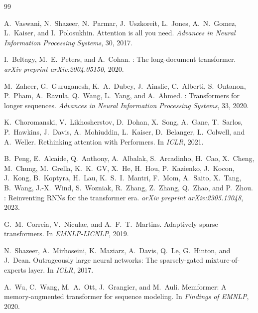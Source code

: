 \documentclass[10pt,twocolumn]{article}
\theoremstyle{plain}
\theoremstyle{definition}
\theoremstyle{remark}
\begin{document}
\begingroup
\small
\begin{thebibliography}{99}

A.~Vaswani, N.~Shazeer, N.~Parmar, J.~Uszkoreit, L.~Jones, A.~N.~Gomez,
L.~Kaiser, and I.~Polosukhin.
\newblock Attention is all you need.
\newblock \textit{Advances in Neural Information Processing Systems}, 30, 2017.

I.~Beltagy, M.~E.~Peters, and A.~Cohan.
: The long-document transformer.
\newblock \textit{arXiv preprint arXiv:2004.05150}, 2020.

M.~Zaheer, G.~Guruganesh, K.~A.~Dubey, J.~Ainslie, C.~Alberti, S.~Ontanon,
P.~Pham, A.~Ravula, Q.~Wang, L.~Yang, and A.~Ahmed.
: Transformers for longer sequences.
\newblock \textit{Advances in Neural Information Processing Systems}, 33, 2020.

K.~Choromanski, V.~Likhosherstov, D.~Dohan, X.~Song, A.~Gane, T.~Sarlos,
P.~Hawkins, J.~Davis, A.~Mohiuddin, L.~Kaiser, D.~Belanger, L.~Colwell,
and A.~Weller.
\newblock Rethinking attention with {Performers}.
\newblock In \textit{ICLR}, 2021.

B.~Peng, E.~Alcaide, Q.~Anthony, A.~Albalak, S.~Arcadinho, H.~Cao,
X.~Cheng, M.~Chung, M.~Grella, K.~K.~GV, X.~He, H.~Hou, P.~Kazienko,
J.~Kocon, J.~Kong, B.~Koptyra, H.~Lau, K.~S.~I.~Mantri, F.~Mom,
A.~Saito, X.~Tang, B.~Wang, J.-X.~Wind, S.~Wozniak, R.~Zhang, Z.~Zhang,
Q.~Zhao, and P.~Zhou.
: Reinventing {RNNs} for the transformer era.
\newblock \textit{arXiv preprint arXiv:2305.13048}, 2023.

G.~M.~Correia, V.~Niculae, and A.~F.~T.~Martins.
\newblock Adaptively sparse transformers.
\newblock In \textit{EMNLP-IJCNLP}, 2019.

N.~Shazeer, A.~Mirhoseini, K.~Maziarz, A.~Davis, Q.~Le, G.~Hinton, and
J.~Dean.
\newblock Outrageously large neural networks: The sparsely-gated
mixture-of-experts layer.
\newblock In \textit{ICLR}, 2017.

A.~Wu, C.~Wang, M.~A.~Ott, J.~Grangier, and M.~Auli.
\newblock Memformer: A memory-augmented transformer for sequence modeling.
\newblock In \textit{Findings of EMNLP}, 2020.


\end{thebibliography}
\end{document}
